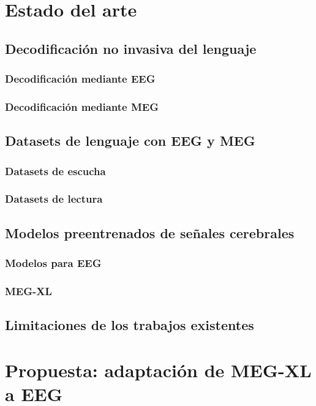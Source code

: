 \documentclass[11pt,spanish,listoffigures,listoftables]{tfgetsinf}
\begin{document}
\chapter{Estado del arte}

\section{Decodificación no invasiva del lenguaje}
\subsection{Decodificación mediante EEG}
\subsection{Decodificación mediante MEG}

\section{Datasets de lenguaje con EEG y MEG}
\subsection{Datasets de escucha}
\subsection{Datasets de lectura}

\section{Modelos preentrenados de señales cerebrales}
\subsection{Modelos para EEG}
\subsection{MEG-XL}

\section{Limitaciones de los trabajos existentes}


\chapter{Propuesta: adaptación de MEG-XL a EEG}
\end{document}
